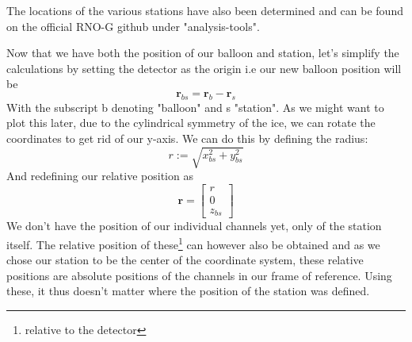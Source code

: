 The locations of the various stations have also been determined and can be found 
on the official RNO-G github under "analysis-tools". 

Now that we have both the position of our balloon and station, 
let's simplify the calculations by setting the detector as the
origin i.e our new balloon position will be
\begin{equation}
  \mathbf{r}_{bs} = \mathbf{r}_b- \mathbf{r}_s
\end{equation}
With the subscript b denoting "balloon" and s "station".
As we might want to plot this later, due to the cylindrical symmetry of the
ice, we can rotate the coordinates to get rid of our y-axis. We can do
this by defining the radius:
\begin{equation}
  r := \sqrt{x_{bs}^2 + y_{bs}^2}
\end{equation}
And redefining our relative position as
\begin{equation}
  \mathbf{r} = 
  \begin{bmatrix}
  r \\
  0 \\
  z_{bs}
  \end{bmatrix}
\end{equation}
We don't have the position of our individual channels yet, only of the station
itself. The relative position of these\footnote{relative to the detector} can
however also be obtained and as we chose our station to be the center of the
coordinate system, these relative positions are absolute positions of the
channels in our frame of reference. Using these, it thus doesn't matter where
the position of the station was defined.

